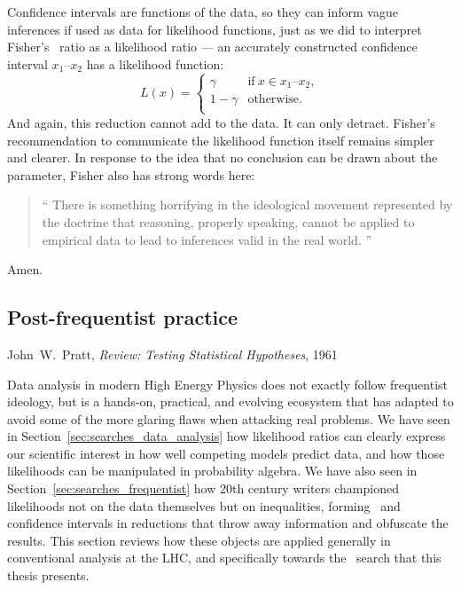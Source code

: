 Confidence intervals are functions of the data, so they can inform vague
inferences if used as data for likelihood functions, just as we did to
interpret Fisher's \pvalue\ ratio as a likelihood ratio ---
an accurately constructed confidence interval $x_1\textrm{--}x_2$ has a
likelihood function:
\begin{equation}
L(x) =
\left\{
\begin{matrix}
\gamma & \textrm{if}~x \in x_1\textrm{--}x_2, \\
1 - \gamma & \textrm{otherwise.} \\
\end{matrix}
\right.
\end{equation}
And again, this reduction cannot add to the data.
It can only detract.
Fisher's recommendation to communicate the likelihood function itself
remains simpler and clearer.
In response to the idea that no conclusion can be drawn about the parameter,
Fisher also has strong words here:
\begin{quote}
\small
``%
There is something horrifying in the ideological movement represented by the
doctrine that reasoning, properly speaking, cannot be applied to empirical data
to lead to inferences valid in the real world.%
''~\cite{fisher1956statistical}
\end{quote}
Amen.

\begin{singlespacing}
\section{Post-frequentist practice}
\label{sec:searches_practice}
\begin{epigraphs}
%
{John~W.~Pratt,
\textit{Review: Testing Statistical Hypotheses},
1961~\cite{pratt1961testing}}
\end{epigraphs}
\end{singlespacing}

Data analysis in modern High Energy Physics does not exactly follow frequentist
ideology, but is a hands-on, practical, and evolving ecosystem that has adapted
to avoid some of the more glaring flaws when attacking real problems.
We have seen in Section~\ref{sec:searches_data_analysis} how likelihood ratios
can clearly express our scientific interest in how well competing models
predict data, and how those likelihoods can be manipulated in probability
algebra.
We have also seen in Section~\ref{sec:searches_frequentist} how 20th century
writers championed likelihoods not on the data themselves but on inequalities,
forming \pvalues\ and confidence intervals in reductions that throw away
information and obfuscate the results.
This section reviews how these objects are applied generally in conventional
analysis at the LHC, and specifically towards the \atlas\ search that this
thesis presents.

